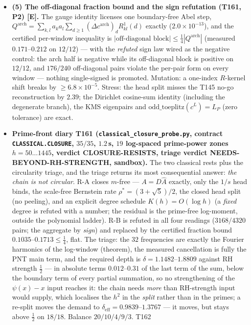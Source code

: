 \documentclass[11pt]{article}
\providecommand{\mE}{\textbf{[E]}}\providecommand{\mC}{\textbf{[C]}}
\begin{document}
\begin{itemize}[leftmargin=1.5em]
\item \textbf{(5) The off-diagonal fraction bound and the sign refutation (T161, P2)
\mE.} The gauge identity licenses one boundary-free Abel step,
$Q^{\mathrm{arch}}=\sum_{k,l}a_ka_l\sum_{d\ge1}(\Delta c^{\mathrm{arch}})_dR^1_{kl}(d)$
exactly ($2.0\times10^{-13}$), and the certified per-window inequality is
$|\text{off-diagonal block}|\le\tfrac14|Q^{\mathrm{arch}}|$ (measured $0.171$--$0.212$
on $12/12$) --- with the \emph{refuted} sign law wired as the negative control: the
arch half is negative while its off-diagonal block is positive on $12/12$, and
$176/240$ off-diagonal pairs violate the per-pair form on every window --- nothing
single-signed is promoted. Mutation: a one-index $R$-kernel shift breaks by
$\ge6.8\times10^{-5}$. Stress: the head split misses the T145 no-go reconstruction by
$2.39$; the Dirichlet cosine-sum identity (including the degenerate branch), the KMS
eigenpairs and $\mathrm{odd\_toeplitz}(c^L)=L_P$ (zero tolerance) are exact.
\item \textbf{Prime-front diary T161 (\texttt{classical\_closure\_probe.py}, contract
\texttt{CLASSICAL.CLOSURE}, $35/35$, $1.2$\,s, $19$ log-spaced prime-power zones
$h=50\ldots1445$, verdict CLOSURE-RESISTS, triage verdict NEEDS-BEYOND-RH-STRENGTH,
sandbox).} The two classical rests plus the circularity triage, and the triage returns
its most consequential answer: \emph{the chain is not circular}. R-A closes $m$-free ---
$A=D\widehat A$ exactly, only the $1/s$ head binds, the scale-free Bernstein rate
$\rho^*=(3+\sqrt5)/2$, the closed head split (no peeling), and an explicit degree
schedule $K(h)=O(\log h)$ (a \emph{fixed} degree is refuted with a number; the residual
is the prime-free log-moment, outside the polynomial ladder). R-B is refuted in all four
readings ($3168/4320$ pairs; the aggregate by \emph{sign}) and replaced by the certified
fraction bound $0.1035$--$0.1713\le\tfrac14$, flat. The triage: the $32$ frequencies are
exactly the Fourier harmonics of the log-window (theorem), the measured cancellation is
fully the PNT main term, and the required depth is $\delta=1.1482$--$1.8809$ against RH
strength $\tfrac12$ --- in absolute terms $0.012$--$0.31$ of the last term of the sum,
below the boundary term of every partial summation, so no strengthening of the
$\psi(x)-x$ input reaches it: the chain needs \emph{more} than RH-strength input would
supply, which localises the $h^2$ in the \emph{split} rather than in the primes; a
re-split moves the demand to $\delta_{\mathrm{eff}}=0.9839$--$1.3767$ --- it moves, but
stays above $\tfrac12$ on $18/18$. Balance $20/10/4/9/3$. T162

\end{itemize}
\end{document}
